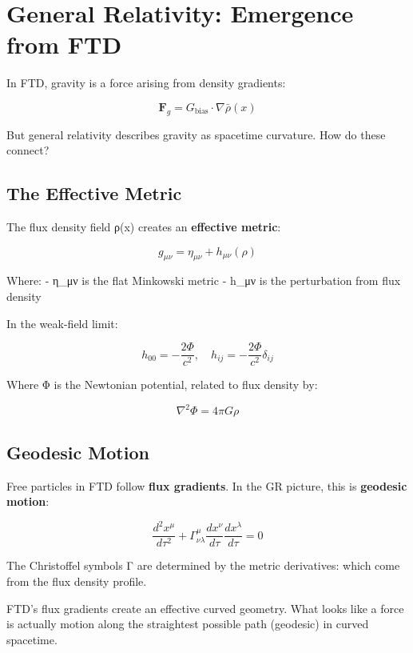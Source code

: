 \documentclass[
  11pt,
  letterpaper,
  twoside,
  openright]{book}
\begin{document}
\section{General Relativity: Emergence from
FTD}\label{general-relativity-emergence-from-ftd}

In FTD, gravity is a force arising from density gradients:

\[\mathbf{F}_g = G_{\text{bias}} \cdot \nabla\bar{\rho}(x)\]

But general relativity describes gravity as spacetime curvature. How do
these connect?

\subsection{The Effective Metric}\label{the-effective-metric}

The flux density field ρ(x) creates an \textbf{effective metric}:

\[g_{\mu\nu} = \eta_{\mu\nu} + h_{\mu\nu}(\rho)\]

Where: - η\_μν is the flat Minkowski metric - h\_μν is the perturbation
from flux density

In the weak-field limit:

\[h_{00} = -\frac{2\Phi}{c^2}, \quad h_{ij} = -\frac{2\Phi}{c^2}\delta_{ij}\]

Where Φ is the Newtonian potential, related to flux density by:

\[\nabla^2\Phi = 4\pi G \rho\]

\subsection{Geodesic Motion}\label{geodesic-motion}

Free particles in FTD follow \textbf{flux gradients}. In the GR picture,
this is \textbf{geodesic motion}:

\[\frac{d^2x^\mu}{d\tau^2} + \Gamma^\mu_{\nu\lambda}\frac{dx^\nu}{d\tau}\frac{dx^\lambda}{d\tau} = 0\]

The Christoffel symbols Γ are determined by the metric derivatives:
which come from the flux density profile.

\begin{tcolorbox}[enhanced jigsaw, coltitle=black, colbacktitle=quarto-callout-note-color!10!white, toprule=.15mm, colframe=quarto-callout-note-color-frame, arc=.35mm, opacityback=0, bottomtitle=1mm, toptitle=1mm, breakable, colback=white, titlerule=0mm, opacitybacktitle=0.6, title=\textcolor{quarto-callout-note-color}{\faInfo}\hspace{0.5em}{Gravity as Geometry}, rightrule=.15mm, bottomrule=.15mm, leftrule=.75mm, left=2mm]

FTD's flux gradients create an effective curved geometry. What looks
like a force is actually motion along the straightest possible path
(geodesic) in curved spacetime.

\end{tcolorbox}
\end{document}
